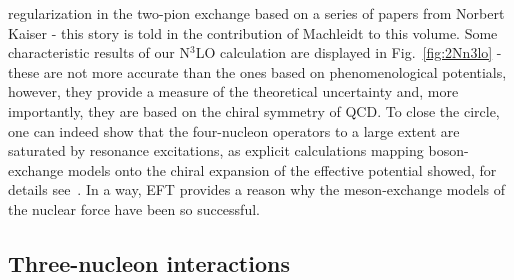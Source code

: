 \documentclass[a4paper,fleqn]{scrartcl}
\begin{document}
{regularization in the two-pion exchange \cite{Entem:2001cg}
based on a series of papers from
Norbert Kaiser - this story is told in the contribution of Machleidt to this volume.
Some characteristic results of our N$^3$LO calculation are displayed
in Fig.~\ref{fig:2Nn3lo} - these are  not more accurate than the ones based on
phenomenological potentials, however, they provide a measure of the
theoretical uncertainty and, more importantly, they are based on the chiral 
symmetry of QCD. To close the circle, one can indeed show that the
four-nucleon operators to a large extent are saturated by resonance
excitations, as explicit calculations mapping boson-exchange models onto
the chiral expansion of the effective potential showed, for details
see~\cite{Epelbaum:2001fm}. In a way, EFT provides a reason why the 
meson-exchange models of the nuclear force have been so successful.

\subsection{Three-nucleon interactions}
\label{sec:three}

}
\end{document}
